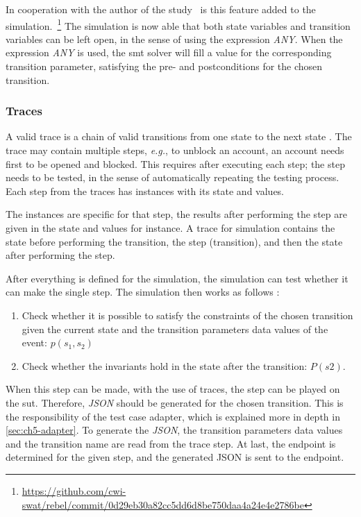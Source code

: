 In cooperation with the author of the study~\cite{stoel_storm_vinju_bosman_2016} is this feature added to the simulation.~\footnote{\url{https://github.com/cwi-swat/rebel/commit/0d29eb30a82cc5dd6d8be750daa4a24e4e2786be}}
The simulation is now able that both state variables and transition variables
can be left open, in the sense of using the expression \textit{ANY}. When the
expression \textit{ANY} is used, the \gls{smt} solver will fill a value for the
corresponding transition parameter, satisfying the pre- and postconditions for
the chosen transition. 

\subsubsection*{Traces}\label{sec:ch5-traces}
A valid trace is a chain of valid transitions from one state to the next state
\cite[p.~5]{stoel_storm_vinju_bosman_2016}. The trace may contain multiple steps,
\textit{e.g.}, to unblock an account, an account needs first to be opened and
blocked. This requires after executing each step; the step needs to be tested,
in the sense of automatically repeating the testing process. Each step from the
traces has instances with its state and values.

The instances are specific
for that step, the results after performing the step are given in the state and
values for instance. A trace for simulation contains the state before
performing the transition, the step (transition), and then the state after
performing the step.

After everything is defined for the simulation, the simulation can test whether
it can make the single step. The simulation then works as follows
\cite[p.~6]{stoel_storm_vinju_bosman_2016}:
\begin{enumerate}
\item Check whether it is possible to satisfy the constraints of the chosen
transition given the current state and the transition parameters data values of
the event: $p(s_{1}, s_{2})$
\item Check whether the invariants hold in the state after the transition:
$P(s2)$.
\end{enumerate}

When this step can be made, with the use of traces, the step can be played on
the \gls{sut}. Therefore, \textit{JSON} should be generated for the chosen
transition. This is the responsibility of the test case adapter, which is
explained more in depth in \autoref{sec:ch5-adapter}. To generate the
\textit{JSON}, the transition parameters data values and
the transition name are read from the trace step. At last, the endpoint is
determined for the given step, and the generated JSON is sent to the endpoint.


